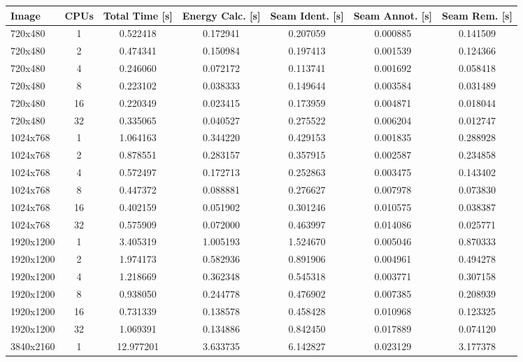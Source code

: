 \documentclass{article}
\begin{document}
\begin{table}[H]
    \centering
    \scriptsize
    \begin{tabular}{lcccccc}
        \toprule
        Image & CPUs & Total Time [s] & Energy Calc. [s] & Seam Ident. [s] & Seam Annot. [s] & Seam Rem. [s] \\
        \midrule
        720x480 & 1 & 0.522418 & 0.172941 & 0.207059 & 0.000885 & 0.141509 \\
        720x480 & 2 & 0.474341 & 0.150984 & 0.197413 & 0.001539 & 0.124366 \\
        720x480 & 4 & 0.246060 & 0.072172 & 0.113741 & 0.001692 & 0.058418 \\
        720x480 & 8 & 0.223102 & 0.038333 & 0.149644 & 0.003584 & 0.031489 \\
        720x480 & 16 & 0.220349 & 0.023415 & 0.173959 & 0.004871 & 0.018044 \\
        720x480 & 32 & 0.335065 & 0.040527 & 0.275522 & 0.006204 & 0.012747 \\
        \midrule
        1024x768 & 1 & 1.064163 & 0.344220 & 0.429153 & 0.001835 & 0.288928 \\
        1024x768 & 2 & 0.878551 & 0.283157 & 0.357915 & 0.002587 & 0.234858 \\
        1024x768 & 4 & 0.572497 & 0.172713 & 0.252863 & 0.003475 & 0.143402 \\
        1024x768 & 8 & 0.447372 & 0.088881 & 0.276627 & 0.007978 & 0.073830 \\
        1024x768 & 16 & 0.402159 & 0.051902 & 0.301246 & 0.010575 & 0.038387 \\
        1024x768 & 32 & 0.575909 & 0.072000 & 0.463997 & 0.014086 & 0.025771 \\
        \midrule
        1920x1200 & 1 & 3.405319 & 1.005193 & 1.524670 & 0.005046 & 0.870333 \\
        1920x1200 & 2 & 1.974173 & 0.582936 & 0.891906 & 0.004961 & 0.494278 \\
        1920x1200 & 4 & 1.218669 & 0.362348 & 0.545318 & 0.003771 & 0.307158 \\
        1920x1200 & 8 & 0.938050 & 0.244778 & 0.476902 & 0.007385 & 0.208939 \\
        1920x1200 & 16 & 0.731339 & 0.138578 & 0.458428 & 0.010968 & 0.123325 \\
        1920x1200 & 32 & 1.069391 & 0.134886 & 0.842450 & 0.017889 & 0.074120 \\
        \midrule
        3840x2160 & 1 & 12.977201 & 3.633735 & 6.142827 & 0.023129 & 3.177378 \\

\end{tabular}
\end{table}
\end{document}
